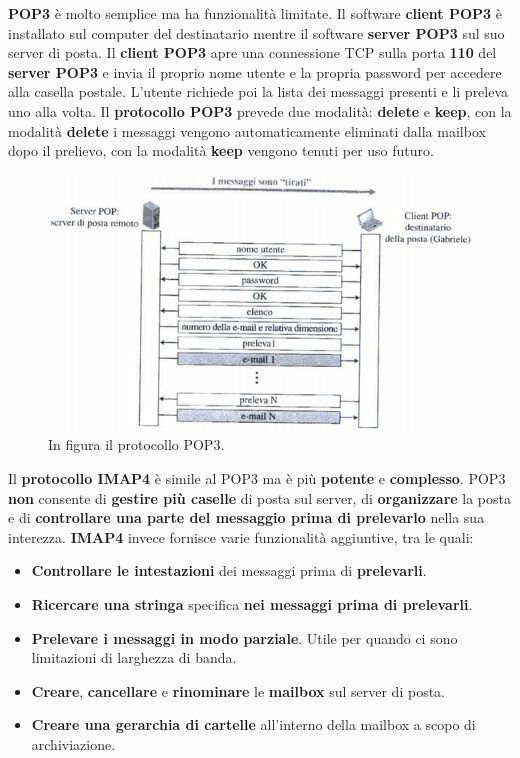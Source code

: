 \documentclass[11pt,a4paper]{article}
\theoremstyle{definition}
\begin{document}
\textbf{POP3} è molto semplice ma ha funzionalità limitate. Il software \textbf{client POP3 } è installato sul computer del destinatario mentre il software \textbf{server POP3 }sul suo server di posta. Il \textbf{client POP3} apre una connessione TCP sulla porta \textbf{110} del \textbf{server POP3} e invia il proprio nome utente e la propria password per accedere alla casella postale. L'utente richiede poi la lista dei messaggi presenti e li preleva uno alla volta.
\newpage
Il \textbf{protocollo POP3} prevede due modalità: \textbf{delete} e \textbf{keep}, con la modalità \textbf{delete} i messaggi vengono automaticamente eliminati dalla mailbox dopo il prelievo, con la modalità \textbf{keep} vengono tenuti per uso futuro.
\begin{figure}[!h]
	\includegraphics[scale=0.6]{Immagini/POP3.png}
	\centering
	\caption{In figura il protocollo POP3.}
\end{figure}\newline
Il \textbf{protocollo IMAP4} è simile al POP3 ma è più \textbf{potente} e \textbf{complesso}. POP3 \textbf{non} consente di \textbf{gestire più caselle }di posta sul server, di \textbf{organizzare} la posta e di \textbf{controllare una parte del messaggio prima di prelevarlo} nella sua interezza. \textbf{IMAP4} invece fornisce varie funzionalità aggiuntive, tra le quali:
\begin{itemize}
	\item \textbf{Controllare le intestazioni} dei messaggi prima di \textbf{prelevarli}.
	\item \textbf{Ricercare una stringa} specifica \textbf{nei messaggi prima di prelevarli}.
	\item \textbf{Prelevare i messaggi in modo parziale}. Utile per quando ci sono limitazioni di larghezza di banda.
	\item \textbf{Creare}, \textbf{cancellare} e \textbf{rinominare} le \textbf{mailbox} sul server di posta.
	\item \textbf{Creare una gerarchia di cartelle} all'interno della mailbox a scopo di archiviazione.
\end{itemize}
\end{document}
